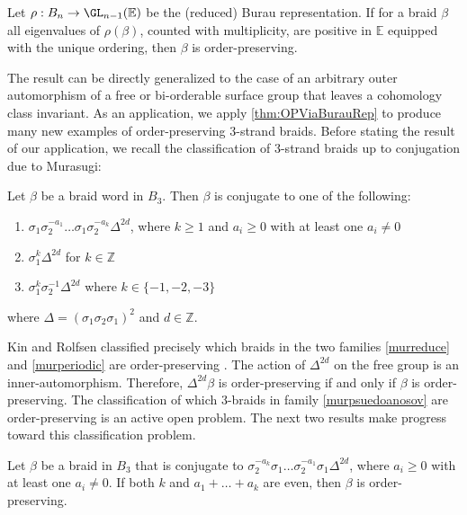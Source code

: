 \documentclass{amsart}
\begin{document}
\begin{thm}\label{thm:OPViaBurauRep}
    Let $\rho:B_n \to \GL_{n-1}(\mathbb{E})$ be the (reduced) Burau representation. If for a braid $\beta$ all eigenvalues of $\rho(\beta)$, counted with multiplicity,
    are positive in $\mathbb{E}$ equipped with the unique ordering, then $\beta$ is order-preserving.  
\end{thm}

The result can be directly generalized to the case of an arbitrary outer automorphism of a free or bi-orderable surface group that leaves a cohomology class invariant. As an application, we apply \cref{thm:OPViaBurauRep} to produce many new examples of order-preserving 3-strand braids. Before stating the result of our application, we recall the classification of 3-strand braids up to conjugation due to Murasugi:

\begin{thm}\cite{Murasugi74}
    \label{thm:MurasugiClassification}
    Let $\beta$ be a braid word in $B_3$. Then $\beta$ is conjugate to one of the following:
    \begin{enumerate}[label = (\alph*)]
        \item $\sigma_1\sigma_2^{-a_1}\dots\sigma_1\sigma_2^{-a_k}\Delta^{2d}$, where $k\geq 1$ and $a_i \geq 0$ with at least one $a_i \neq 0$ \label{murpsuedoanosov}
        \item $\sigma_1^k\Delta^{2d}$ for $k \in \mathbb{Z}$ \label{murreduce}
        \item $\sigma_1^k\sigma_2^{-1}\Delta^{2d}$ where $k \in \{-1,-2,-3\}$ \label{murperiodic}
    \end{enumerate}
    where $\Delta = (\sigma_1\sigma_2\sigma_1)^2$ and $d\in \mathbb{Z}$. 
\end{thm}

Kin and Rolfsen classified precisely which braids in the two families \ref{murreduce} and \ref{murperiodic} are order-preserving \cite[Proposition 4.5, Corollary 4.7, Theorem 4.10]{KinRolfsen18}.
The action of $\Delta^{2d}$ on the free group is an inner-automorphism. Therefore, $\Delta^{2d}\beta$ is order-preserving if and only if $\beta$ is order-preserving.
The classification of which 3-braids in family \ref{murpsuedoanosov} are order-preserving is an active open problem. The next two results make progress toward this classification problem. 

\begin{thm}
    \label{thm:EvenEvenBraidsAreOP}
    Let $\beta$ be a braid in $B_3$ that is conjugate to $\sigma_2^{-a_k}\sigma_1\dots\sigma_2^{-a_1}\sigma_1\Delta^{2d}$, where $a_i \geq 0$ with at least one $a_i \neq 0$. If both $k$ and $a_1+\dots+a_k$ are even, then $\beta$ is order-preserving. 
\end{thm}
\end{document}
